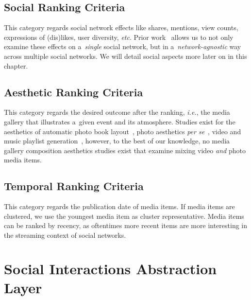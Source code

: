 \subsection{Social Ranking Criteria}

This category regards social network effects like shares, mentions,
view counts, expressions of (dis)likes, user diversity, \emph{etc}.
Prior work~\cite{khrouf2012aggregatingsocialmedia}
allows us to not only examine these effects
on a~\emph{single} social network,
but in a~\emph{network-agnostic} way across multiple social networks.
We will detail social aspects more later on in this chapter.

\subsection{Aesthetic Ranking Criteria}

This category regards the desired outcome after the ranking, \emph{i.e.},
the media gallery that illustrates a~given event and its atmosphere.
Studies exist for the aesthetics of
automatic photo book layout~\cite{sandhaus2011photobook},
photo aesthetics \emph{per se}~\cite{obrador2012photoaesthetics},
video and music playlist generation~\cite{knees2006musicplaylist,davidson2010videorecommendation},
however, to the best of our knowledge,
no media gallery composition aesthetics studies exist
that examine mixing video \emph{and} photo media items.

\subsection{Temporal Ranking Criteria}

This category regards the publication date of media items.
If media items are clustered, we use the youngest media item
as cluster representative.
Media items can be ranked by recency, as oftentimes more recent items
are more interesting in the streaming context of social networks.

\section{Social Interactions Abstraction Layer}
\label{sec:social-interactions-abstraction-layer}

